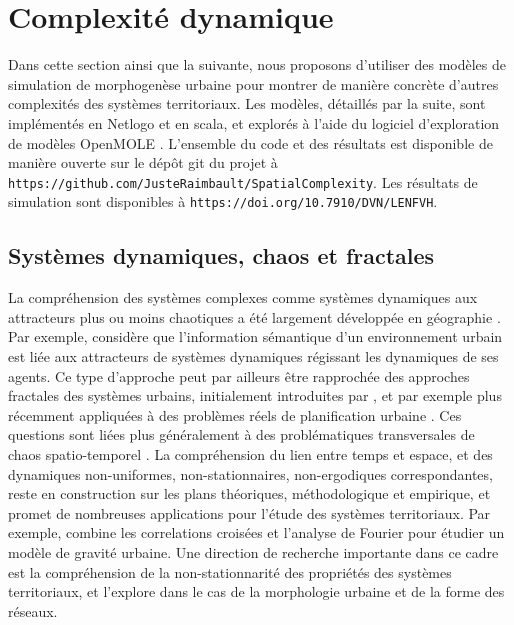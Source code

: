 \documentclass[11pt]{article}
\begin{document}
\section{Complexité dynamique}


Dans cette section ainsi que la suivante, nous proposons d'utiliser des modèles de simulation de morphogenèse urbaine pour montrer de manière concrète d'autres complexités des systèmes territoriaux. Les modèles, détaillés par la suite, sont implémentés en Netlogo \cite{wilensky1999netlogo} et en scala, et explorés à l'aide du logiciel d'exploration de modèles OpenMOLE \cite{reuillon2013openmole}. L'ensemble du code et des résultats est disponible de manière ouverte sur le dépôt git du projet à \texttt{https://github.com/JusteRaimbault/SpatialComplexity}. Les résultats de simulation sont disponibles à \texttt{https://doi.org/10.7910/DVN/LENFVH}.


\subsection{Systèmes dynamiques, chaos et fractales}


La compréhension des systèmes complexes comme systèmes dynamiques aux attracteurs plus ou moins chaotiques a été largement développée en géographie \citep{dauphine1995chaos}. Par exemple, \cite{e18060197} considère que l'information sémantique d'un environnement urbain est liée aux attracteurs de systèmes dynamiques régissant les dynamiques de ses agents. Ce type d'approche peut par ailleurs être rapprochée des approches fractales des systèmes urbains, initialement introduites par \cite{batty1994fractal}, et par exemple plus récemment appliquées à des problèmes réels de planification urbaine \citep{yamu2015spatial}. Ces questions sont liées plus généralement à des problématiques transversales de chaos spatio-temporel \citep{crutchfield1987phenomenology}. La compréhension du lien entre temps et espace, et des dynamiques non-uniformes, non-stationnaires, non-ergodiques correspondantes, reste en construction sur les plans théoriques, méthodologique et empirique, et promet de nombreuses applications pour l'étude des systèmes territoriaux. Par exemple,  \cite{chen2009urban} combine les correlations croisées et l'analyse de Fourier pour étudier un modèle de gravité urbaine. Une direction de recherche importante dans ce cadre est la compréhension de la non-stationnarité des propriétés des systèmes territoriaux, et \cite{raimbault2018urban} l'explore dans le cas de la morphologie urbaine et de la forme des réseaux.
\end{document}
